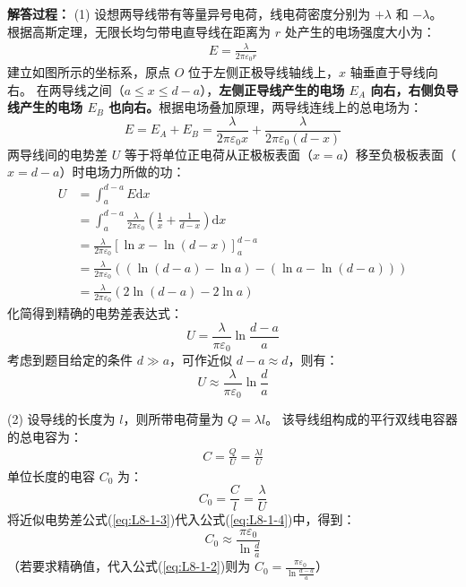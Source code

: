 \begin{enumerate}
	\textbf{解答过程： }
	(1) 设想两导线带有等量异号电荷，线电荷密度分别为 $+\lambda$ 和 $-\lambda$。
	根据高斯定理，无限长均匀带电直导线在距离为 $r$ 处产生的电场强度大小为：
	\begin{align*}
		E = \frac{\lambda}{2\pi\varepsilon_0 r}
	\end{align*}
	建立如图所示的坐标系，原点 $O$ 位于左侧正极导线轴线上，$x$ 轴垂直于导线向右。
	在两导线之间（$a \le x \le d-a$），\textbf{左侧正导线产生的电场 $E_A$ 向右，右侧负导线产生的电场 $E_B$ 也向右。}根据电场叠加原理，两导线连线上的总电场为：
	\begin{equation}\label{eq:L8-1-1}
		E = E_A + E_B = \frac{\lambda}{2\pi\varepsilon_0 x} + \frac{\lambda}{2\pi\varepsilon_0 (d-x)}
	\end{equation}
	两导线间的电势差 $U$ 等于将单位正电荷从正极板表面（$x=a$）移至负极板表面（$x=d-a$）时电场力所做的功：
	\begin{align*}
		U &= \int_{a}^{d-a} E \mathrm{d}x \\
		&= \int_{a}^{d-a} \frac{\lambda}{2\pi\varepsilon_0} \left( \frac{1}{x} + \frac{1}{d-x} \right) \mathrm{d}x \\
		&= \frac{\lambda}{2\pi\varepsilon_0} \left[ \ln x - \ln(d-x) \right]_{a}^{d-a} \\
		&= \frac{\lambda}{2\pi\varepsilon_0} \left( (\ln(d-a) - \ln a) - (\ln a - \ln(d-a)) \right) \\
		&= \frac{\lambda}{2\pi\varepsilon_0} \left( 2\ln(d-a) - 2\ln a \right)
	\end{align*}
	化简得到精确的电势差表达式：
	\begin{equation}\label{eq:L8-1-2}
		U = \frac{\lambda}{\pi\varepsilon_0} \ln\frac{d-a}{a}
	\end{equation}
	考虑到题目给定的条件 $d \gg a$，可作近似 $d-a \approx d$，则有：
	\begin{equation}\label{eq:L8-1-3}
		U \approx \frac{\lambda}{\pi\varepsilon_0} \ln\frac{d}{a}
	\end{equation}
	
	(2) 设导线的长度为 $l$，则所带电荷量为 $Q = \lambda l$。
	该导线组构成的平行双线电容器的总电容为：
	\begin{align*}
		C = \frac{Q}{U} = \frac{\lambda l}{U}
	\end{align*}
	单位长度的电容 $C_0$ 为：
	\begin{equation}\label{eq:L8-1-4}
		C_0 = \frac{C}{l} = \frac{\lambda}{U}
	\end{equation}
	将近似电势差公式(\ref{eq:L8-1-3})代入公式(\ref{eq:L8-1-4})中，得到：
	\begin{equation}\label{eq:L8-1-5}
		C_0 \approx \frac{\pi\varepsilon_0}{\ln\frac{d}{a}}
	\end{equation}
	（若要求精确值，代入公式(\ref{eq:L8-1-2})则为 $C_0 = \frac{\pi\varepsilon_0}{\ln\frac{d-a}{a}}$）
	

\end{enumerate}
